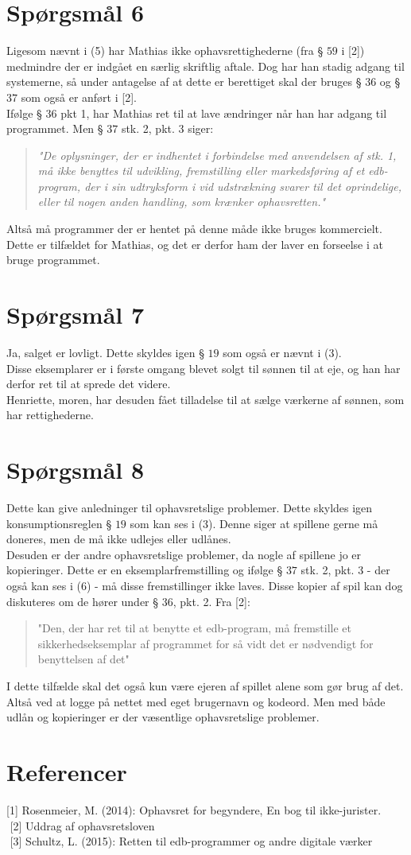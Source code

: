 \documentclass[12pt]{article}
\begin{document}
\section*{Spørgsmål 6}
Ligesom nævnt i (5) har Mathias ikke ophavsrettighederne (fra § $59$ i [2]) medmindre der er indgået en særlig skriftlig aftale. Dog har han stadig adgang til systemerne, så under antagelse af at dette er berettiget skal der bruges § $36$ og § $37$ som også er anført i [2]. \\
Ifølge § $36$ pkt 1, har Mathias ret til at lave ændringer når han har adgang til programmet. Men § $37$ stk. 2, pkt. 3 siger:
\begin{quote}
\textit{"De oplysninger, der er indhentet i forbindelse med anvendelsen af stk. 1, må ikke benyttes til udvikling, fremstilling eller markedsføring af et edb-program, der i sin udtryksform i vid udstrækning svarer til det oprindelige, eller til nogen anden handling, som krænker ophavsretten."}
\end{quote}
Altså må programmer der er hentet på denne måde ikke bruges kommercielt. Dette er tilfældet for Mathias, og det er derfor ham der laver en forseelse i at bruge programmet.

\section*{Spørgsmål 7}
Ja, salget er lovligt. Dette skyldes igen § $19$ som også er nævnt i (3).\\
Disse eksemplarer er i første omgang blevet solgt til sønnen til at eje, og han har derfor ret til at sprede det videre.\\
Henriette, moren, har desuden fået tilladelse til at sælge værkerne af sønnen, som har rettighederne.

\section*{Spørgsmål 8}
Dette kan give anledninger til ophavsretslige problemer. Dette skyldes igen konsumptionsreglen § $19$ som kan ses i (3). Denne siger at spillene gerne må doneres, men de må ikke udlejes eller udlånes. \\
Desuden er der andre ophavsretslige problemer, da nogle af spillene jo er kopieringer. Dette er en eksemplarfremstilling og ifølge § $37$ stk. 2, pkt. 3 - der også kan ses i (6) - må disse fremstillinger ikke laves. Disse kopier af spil kan dog diskuteres om de hører under § $36$, pkt. 2. Fra [2]:
\begin{quote}
"Den, der har ret til at benytte et edb-program, må fremstille et sikkerhedseksemplar af programmet for så vidt det er nødvendigt for benyttelsen af det"
\end{quote}
I dette tilfælde skal det også kun være ejeren af spillet alene som gør brug af det. Altså ved at logge på nettet med eget brugernavn og kodeord. Men med både udlån og kopieringer er der væsentlige ophavsretslige problemer.

\section*{Referencer}
[1] Rosenmeier, M. (2014): Ophavsret for begyndere, En bog til ikke-jurister.\\
$ $
[2] Uddrag af ophavsretsloven \\
$ $
[3] Schultz, L. (2015): Retten til edb-programmer og andre digitale værker
\end{document}
